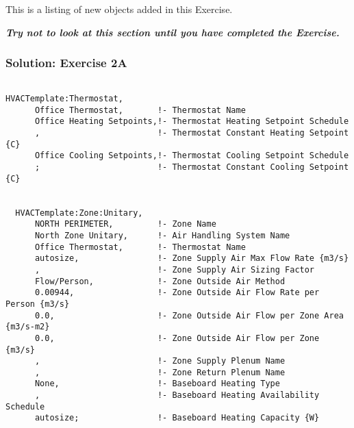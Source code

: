 This is a listing of new objects added in this Exercise.

\textbf{\emph{Try not to look at this section until you have completed the Exercise.}}

\subsubsection{Solution: Exercise 2A}\label{solution-exercise-2a}

\begin{lstlisting}

HVACTemplate:Thermostat,
      Office Thermostat,       !- Thermostat Name
      Office Heating Setpoints,!- Thermostat Heating Setpoint Schedule
      ,                        !- Thermostat Constant Heating Setpoint {C}
      Office Cooling Setpoints,!- Thermostat Cooling Setpoint Schedule
      ;                        !- Thermostat Constant Cooling Setpoint {C}


  HVACTemplate:Zone:Unitary,
      NORTH PERIMETER,         !- Zone Name
      North Zone Unitary,      !- Air Handling System Name
      Office Thermostat,       !- Thermostat Name
      autosize,                !- Zone Supply Air Max Flow Rate {m3/s}
      ,                        !- Zone Supply Air Sizing Factor
      Flow/Person,             !- Zone Outside Air Method
      0.00944,                 !- Zone Outside Air Flow Rate per Person {m3/s}
      0.0,                     !- Zone Outside Air Flow per Zone Area {m3/s-m2}
      0.0,                     !- Zone Outside Air Flow per Zone {m3/s}
      ,                        !- Zone Supply Plenum Name
      ,                        !- Zone Return Plenum Name
      None,                    !- Baseboard Heating Type
      ,                        !- Baseboard Heating Availability Schedule
      autosize;                !- Baseboard Heating Capacity {W}



\end{lstlisting}
